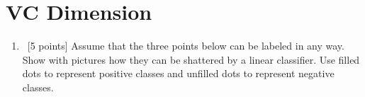 \section{VC Dimension}
\label{sec:vc-dimension}
\begin{enumerate}
\item ~[5 points] Assume that the three points below can be labeled
  in any way.  Show with pictures how they can be shattered by a
  linear classifier.  Use filled dots to represent positive classes
  and unfilled dots to represent negative classes.


\begin{solution}


\end{solution}
\end{enumerate}

